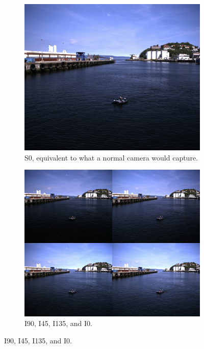 \begin{figure}[H]
    \begin{subfigure}[T]{.49\textwidth}
        \includegraphics[width=\textwidth]{figures/img_0080_right_s0.jpg}
        \caption{S0, equivalent to what a normal camera would capture.}
    \end{subfigure}
    \hfill
    \begin{subfigure}[T]{.49\textwidth}
        \includegraphics[width=\textwidth]{figures/img_0080_right_inten.jpg}
        \caption{I90, I45, I135, and I0.}
    \end{subfigure}


\end{figure}
